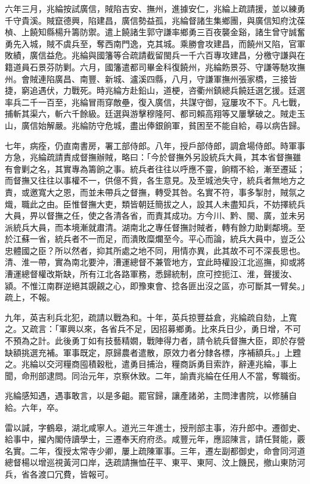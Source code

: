 \begin{pinyinscope}
六年三月，兆綸按試廣信，賊陷吉安、撫州，進據安仁，兆綸上疏請援，並以練勇千守貴溪。賊竄德興，陷建昌，廣信勢益孤，兆綸督諸生集鄉團，與廣信知府沈葆楨、上饒知縣楊升籌防禦。遣上饒諸生郭守謙率鄉勇三百夜襲金谿，諸生曾守誠奮勇先入城，賊不虞兵至，奪西南門逸，克其城。乘勝會攻建昌，而饒州又陷，官軍敗績，廣信益危。兆綸與國籓等合疏請截留閩兵一千六百專攻建昌，分檄守謙與在籍道員石景芬防剿。六月，國籓遣都司畢金科復饒州，兆綸飭景芬、守謙等馳攻撫州。會賊連陷廣昌、南豐、新城、瀘溪四縣，八月，守謙軍撫州張家橋，三接皆捷，窮追遇伏，力戰死。時兆綸方赴鉛山，道梗，咨衢州鎮總兵饒廷選乞援。廷選率兵二千一百至，兆綸冒雨穿敵壘，復入廣信，共謀守御，寇屢攻不下。凡七戰，捕斬其渠六，斬六千餘級。廷選與游擊穆隆阿、都司賴高翔等又屢擊破之。賊走玉山，廣信始解嚴。兆綸防守危城，盡出俸銀餉軍，貧困至不能自給，尋以病告歸。

七年，病痊，仍直南書房，署工部侍郎。八年，授戶部侍郎，調倉場侍郎。時軍事方急，兆綸疏請責成督撫辦賊，略曰：「今於督撫外另設統兵大員，其本省督撫雖有會剿之名，其實專為籌餉之事。統兵者往往以呼應不靈，餉糈不給，漸至遷延；而督撫又往往以事權不一，供億不貲，各生意見。及至城池失守，統兵者無地方之責，或邀寬大之恩，而並未帶兵之督撫，轉受其咎。名實不符，事多掣肘，賊氛之熾，職此之由。臣惟督撫大吏，類皆朝廷簡拔之人，設其人未盡知兵，不妨擇統兵大員，畀以督撫之任，使之各清各省，而責其成功。方今川、黔、閩、廣，並未另派統兵大員，而本境漸就肅清。湖南北之專任督撫討賊者，轉有餘力助剿鄰境。至於江蘇一省，統兵者不一而足，而潰敗糜爛至今。平心而論，統兵大員中，豈乏公忠體國之臣？所以然者，抑其所處之地不同，用情亦異，此其故不可不深長思也。清、淮一帶，實為南北要沖，漕運總督不兼管地方，宜此時權設江北巡撫，抑或將漕運總督權改斯缺，所有江北各路軍務，悉歸統制，庶可控扼江、淮，聲援汝、潁。不惟江南群逆絕其覬覦之心，即豫東會、捻各匪出沒之區，亦可斷其一臂矣。」疏上，不報。

九年，英吉利兵北犯，疏請以戰為和。十年，英兵掠豐益倉，兆綸疏自劾，上寬之。又疏言：「軍興以來，各省兵不足，因招募鄉勇。比來兵日少，勇日增，不可不預為之計。此後勇丁如有技藝精嫺，戰陣得力者，請令統兵督撫大臣，即於存營缺額挑選充補。軍事既定，原歸農者遣散，原效力者分隸各標，序補額兵。」上韙之。兆綸以交河糧商囤積穀秕，遣勇目捕治，糧商訴勇目索詐，辭連兆綸，事上聞，命刑部逮問。同治元年，京察休致。二年，諭責兆綸在任用人不當，奪職銜。

兆綸感知遇，遇事敢言，以是多齟。罷官歸，讓產諸弟，主問津書院，以修脯自給。六年，卒。

雷以諴，字鶴皋，湖北咸寧人。道光三年進士，授刑部主事，洊升郎中。遷御史、給事中，擢內閣侍讀學士，三遷奉天府府丞。咸豐元年，應詔陳言，請任賢能，覈名實。二年，復授太常寺少卿，屢上疏陳軍事。三年，遷左副都御史，命會同河道總督楊以增巡視黃河口岸，迭疏請撫恤茌平、東平、東阿、汶上饑民，撤山東防河兵，省各渡口冗費，皆報可。


\end{pinyinscope}
